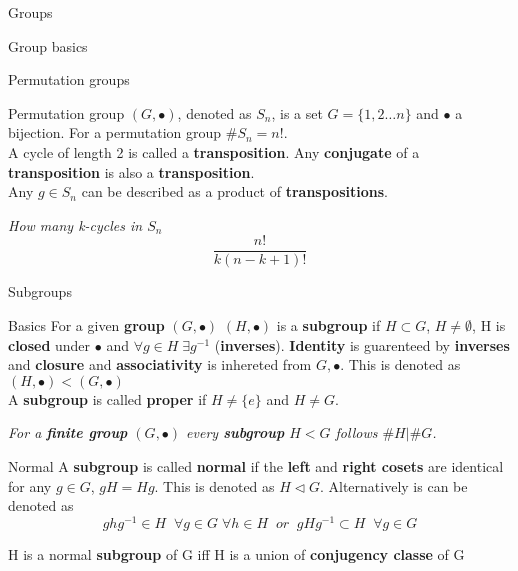\documentclass[12pt, letterpaper]{article}
\begin{document}
\begin{section}{Groups}
\begin{subsection}{Group basics}
    \begin{subsubsection}{Permutation groups}

      Permutation group \((G, \bullet)\), denoted as \(S_{n}\), is a set
      \(G = \{ 1, 2 \dots n \}\) and \(\bullet\) a bijection.
      For a permutation group \(\#S_{n} = n!\). \\
      A cycle of length 2 is called a \textbf{transposition}. Any \textbf{conjugate}
      of a \textbf{transposition} is also a \textbf{transposition}. \\
      Any \(g \in S_{n}\) can be described as a product of \textbf{transpositions}.

      \emph{How many k-cycles in \(S_{n}\) \[\frac{n!}{k(n-k+1)!}\]}

    \end{subsubsection}

  \end{subsection}

  \begin{subsection}{Subgroups}

    \begin{subsubsection}{Basics}
      For a given \textbf{group} \((G, \bullet)\) \((H, \bullet)\) is a \textbf{subgroup}
      if \(H \subset G\), \(H \neq \emptyset\), H is \textbf{closed} under \(\bullet\)
      and \(\forall g \in H \; \exists g^{-1}\) (\textbf{inverses}). \textbf{Identity}
      is guarenteed by \textbf{inverses} and \textbf{closure} and \textbf{associativity}
      is inhereted from \(G, \bullet\). This is denoted as \((H, \bullet) < (G, \bullet)\) \\
      A \textbf{subgroup} is called \textbf{proper} if \(H \neq \{{} e \}{}\) and
      \(H \neq G\).

      \emph{For a \textbf{finite group} \((G, \bullet)\) every \textbf{subgroup}
        \(H < G\) follows \(\#H|\#G\).}
    \end{subsubsection}

    \begin{subsubsection}{Normal}
      A \textbf{subgroup} is called \textbf{normal} if the \textbf{left} and
      \textbf{right cosets} are identical for any \(g \in G\), \(gH = Hg\).
      This is denoted as \(H \triangleleft G\). Alternatively is can be denoted as
      \[ghg^{-1} \in H \;\; \forall g \in G \; \forall h \in H \;\;
        or \;\; gHg^{-1} \subset H \;\; \forall g \in G\]

      H is a normal \textbf{subgroup} of G iff H is a union of \textbf{conjugency classe}
      of G
    \end{subsubsection}


\end{subsection}
\end{section}
\end{document}
